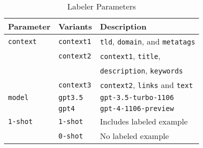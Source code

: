 \begin{table}[!ht]
    \centering
    \caption{Labeler Parameters}
    \begin{tabular}{lll}
        \toprule
        \textbf{Parameter} & \textbf{Variants} & \textbf{Description} \\
        \midrule
        \texttt{context} 
            & \texttt{context1} & \texttt{tld}, \texttt{domain}, and \texttt{metatags} \\
            
            & \texttt{context2} & \texttt{context1}, \texttt{title},\\ & & \texttt{description}, \texttt{keywords} \\
            
            & \texttt{context3} & \texttt{context2}, \texttt{links} and \texttt{text} \\

        \addlinespace
        \texttt{model} 
            & \texttt{gpt3.5} & \texttt{gpt-3.5-turbo-1106} \\
            
            & \texttt{gpt4} & \texttt{gpt-4-1106-preview} \\
        
        \addlinespace
        \texttt{1-shot} 
            & \texttt{1-shot} & Includes labeled example \\
            
            & \texttt{0-shot} & No labeled example \\
        \bottomrule
    
    \end{tabular}
    \label{tab:labeler-params}
\end{table}